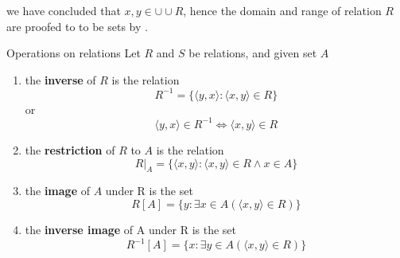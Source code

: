 \begin{remarks}
    we have concluded that $x, y \in \cup \cup R$, hence the domain and range of relation $R$ are proofed to to be sets by .
\end{remarks}

\begin{definition}{Operations on relations}{}
    Let $R$ and $S$ be relations, and given set $A$
    \begin{enumerate}

        \item the \textbf{inverse} of $R$ is the relation
        \begin{equation*}
            R^{-1} = \{\langle y,x \rangle : \langle x,y \rangle \in R\}
        \end{equation*}
        or
        \begin{equation*}
            \langle y,x \rangle \in R^{-1} \iff \langle x,y \rangle \in R
        \end{equation*}
        \item the \textbf{restriction} of $R$ to $A$ is the relation
        \begin{equation*}
            R \vert_{A} = \{\langle x,y \rangle : \langle x,y \rangle \in R \land x \in A\}
        \end{equation*}
        \item the \textbf{image} of $A$ under R is the set
        \begin{equation*}
            R[A] = \{y : \exists x \in A (\langle x,y \rangle \in R)\}
        \end{equation*}
        \item the \textbf{inverse image} of A under R is the set
        \begin{equation*}
            R^{-1}[A] = \{x : \exists y \in A(\langle x,y \rangle \in R)\}
        \end{equation*}

    \end{enumerate}
    
\end{definition}

